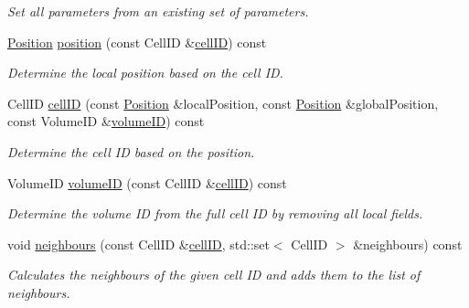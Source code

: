 \begin{DoxyCompactItemize}
\begin{DoxyCompactList}\small\item\em Set all parameters from an existing set of parameters. \end{DoxyCompactList}\item 
\hyperlink{namespace_d_d4hep_1_1_geometry_a55083902099d03506c6db01b80404900}{Position} \hyperlink{class_d_d4hep_1_1_geometry_1_1_segmentation_object_a8b541e7ca32f66c59bcda9fd7d9c461f}{position} (const Cell\+ID \&\hyperlink{class_d_d4hep_1_1_geometry_1_1_segmentation_object_a45ef8e9a429b44b45ec7a50cc0da3817}{cell\+ID}) const
\begin{DoxyCompactList}\small\item\em Determine the local position based on the cell ID. \end{DoxyCompactList}\item 
Cell\+ID \hyperlink{class_d_d4hep_1_1_geometry_1_1_segmentation_object_a45ef8e9a429b44b45ec7a50cc0da3817}{cell\+ID} (const \hyperlink{namespace_d_d4hep_1_1_geometry_a55083902099d03506c6db01b80404900}{Position} \&local\+Position, const \hyperlink{namespace_d_d4hep_1_1_geometry_a55083902099d03506c6db01b80404900}{Position} \&global\+Position, const Volume\+ID \&\hyperlink{class_d_d4hep_1_1_geometry_1_1_segmentation_object_a0a89da9aa8101caea4a069e4cfb2ab6f}{volume\+ID}) const
\begin{DoxyCompactList}\small\item\em Determine the cell ID based on the position. \end{DoxyCompactList}\item 
Volume\+ID \hyperlink{class_d_d4hep_1_1_geometry_1_1_segmentation_object_a0a89da9aa8101caea4a069e4cfb2ab6f}{volume\+ID} (const Cell\+ID \&\hyperlink{class_d_d4hep_1_1_geometry_1_1_segmentation_object_a45ef8e9a429b44b45ec7a50cc0da3817}{cell\+ID}) const
\begin{DoxyCompactList}\small\item\em Determine the volume ID from the full cell ID by removing all local fields. \end{DoxyCompactList}\item 
void \hyperlink{class_d_d4hep_1_1_geometry_1_1_segmentation_object_a349b5276d48d2aec11b25c98a52f6900}{neighbours} (const Cell\+ID \&\hyperlink{class_d_d4hep_1_1_geometry_1_1_segmentation_object_a45ef8e9a429b44b45ec7a50cc0da3817}{cell\+ID}, std\+::set$<$ Cell\+ID $>$ \&neighbours) const
\begin{DoxyCompactList}\small\item\em Calculates the neighbours of the given cell ID and adds them to the list of neighbours. \end{DoxyCompactList}\end{DoxyCompactItemize}
